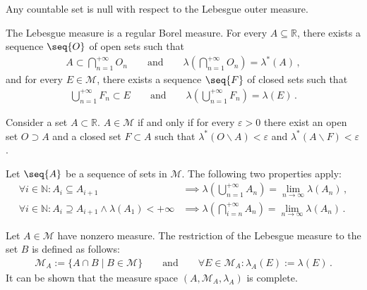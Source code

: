     \begin{property}\label{measure:countable_set_is_null}
        Any countable set is null with respect to the Lebesgue outer measure.
    \end{property}

    \begin{property}[Regularity]
        The Lebesgue measure is a regular Borel measure. For every $A\subseteq\mathbb{R}$, there exists a sequence $\seq{O}$ of open sets such that
        \begin{gather}
            \label{measure:open_cover_existence}
            A\subset\bigcap_{n=1}^{+\infty} O_n\qquad\text{and}\qquad\lambda\left(\bigcap_{n=1}^{+\infty} O_n\right) = \lambda^*(A)\,,
        \end{gather}
        and for every $E\in\mathcal{M}$, there exists a sequence $\seq{F}$ of closed sets such that
        \begin{gather}
            \label{measure:closed_cover_existence}
            \bigcup_{n=1}^{+\infty} F_n\subset E\qquad\text{and}\qquad\lambda\left(\bigcup_{n=1}^{+\infty} F_n\right) = \lambda(E)\,.
        \end{gather}
    \end{property}

    \begin{property}
        Consider a set $A\subset\mathbb{R}$. $A\in\mathcal{M}$ if and only if for every $\varepsilon>0$ there exist an open set $O\supset A$ and a closed set $F\subset A$ such that $\lambda^*(O\backslash A) < \varepsilon$ and $\lambda^*(A\backslash F)<\varepsilon$.
    \end{property}

    \begin{property}
        Let $\seq{A}$ be a sequence of sets in $\mathcal{M}$. The following two properties apply:
        \begin{align}
            \forall i\in\mathbb{N}:A_i\subseteq A_{i+1} &\implies \lambda\left(\bigcup_{n=1}^{+\infty} A_n\right) = \lim_{n\rightarrow\infty}\lambda(A_n)\,,\\
            \forall i\in\mathbb{N}:A_i\supseteq A_{i+1}\land\lambda(A_1)<+\infty &\implies\lambda\left(\bigcap_{i=n}^{+\infty} A_n\right) = \lim_{n\rightarrow\infty}\lambda(A_n)\,.
        \end{align}
    \end{property}

    \begin{construct}[Restriction]\label{measure:restricted_lebesgue_measure}
        Let $A\in\mathcal{M}$ have nonzero measure. The restriction of the Lebesgue measure to the set $B$ is defined as follows:
        \begin{gather}
            \mathcal{M}_A := \{A\cap B\mid B\in\mathcal{M}\} \qquad\text{and}\qquad \forall E\in\mathcal{M}_A:\lambda_A(E) := \lambda(E)\,.
        \end{gather}
        It can be shown that the measure space $(A,\mathcal{M}_A,\lambda_A)$ is complete.
    \end{construct}

